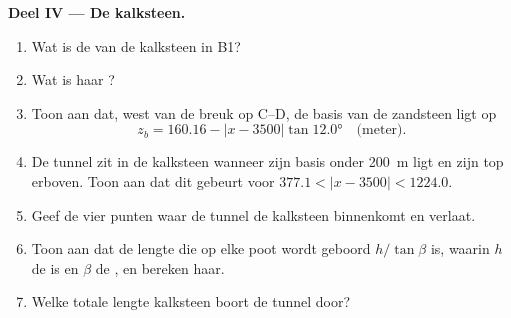 \begin{problem}
\medskip
\noindent\textbf{Deel IV --- De kalksteen.}
\begin{enumerate}[resume]
  \item Wat is de  van de kalksteen in B1?
  \item Wat is haar ?
  \item Toon aan dat, west van de breuk op C--D, de basis van de zandsteen ligt op
        \[ z_b = 160.16 - |x - 3500|\tan\ang{12.0} \quad\text{(meter)}. \]
  \item De tunnel zit in de kalksteen wanneer zijn basis onder \qty{200}{m} ligt en zijn top erboven. Toon aan dat dit
        gebeurt voor $377.1 < |x - 3500|
        < 1224.0$.
  \item Geef de vier punten waar de tunnel de kalksteen binnenkomt en verlaat.
  \item Toon aan dat de lengte die op elke poot wordt geboord $h/\tan\beta$ is, waarin $h$ de  is en
        $\beta$ de , en bereken haar.
  \item Welke totale lengte kalksteen boort de tunnel door?
\end{enumerate}
\end{problem}
